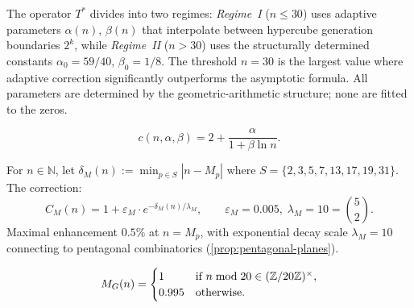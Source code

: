 The operator $T^*$ divides into two regimes: \emph{Regime~I} ($n\le 30$)
uses adaptive parameters $\alpha(n)$, $\beta(n)$ that interpolate between
hypercube generation boundaries $2^k$, while \emph{Regime~II} ($n>30$) uses
the structurally determined constants $\alpha_0=59/40$, $\beta_0=1/8$.  The
threshold $n=30$ is the largest value where adaptive correction significantly
outperforms the asymptotic formula.  All parameters are determined by the
geometric-arithmetic structure; none are fitted to the zeros.

\begin{Definition}\label{def:c-function}
\begin{equation}\label{eq:c-function}
  c(n,\alpha,\beta) = 2 + \frac{\alpha}{1+\beta\ln n}.
\end{equation}
\end{Definition}

\begin{Definition}\label{def:mersenne-correction}
For $n\in\mathbb{N}$, let
$\delta_M(n) := \min_{p\in S}|n - M_p|$ where
$S = \{2,3,5,7,13,17,19,31\}$. The correction:
\begin{equation}\label{eq:mersenne-correction}
  C_M(n) = 1 + \varepsilon_M\cdot
    e^{-\delta_M(n)/\lambda_M},
  \qquad \varepsilon_M = 0.005,\;
  \lambda_M = 10 = \binom{5}{2}.
\end{equation}
Maximal enhancement $0.5\%$ at $n = M_p$, with exponential decay scale
$\lambda_M = 10$ connecting to pentagonal combinatorics
(\cref{prop:pentagonal-planes}).
\end{Definition}

\begin{Definition}\label{def:golden-modulation}
\begin{equation}\label{eq:golden-modulation}
  M_G(n) = \begin{cases}
    1     & \text{if } n\bmod 20 \in (\mathbb{Z}/20\mathbb{Z})^\times, \\
    0.995 & \text{otherwise}.
  \end{cases}
\end{equation}
\end{Definition}

